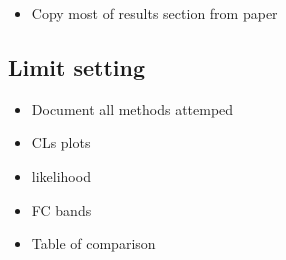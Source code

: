 {\color{Red}
\begin{itemize}
\item Copy most of results section from paper
\end{itemize}
}




\subsection{Limit setting}
\label{sec:B2DsPhi_limitsetting}

{\color{Red}
\begin{itemize}
\item Document all methods attemped
\item CLs plots
\item likelihood
\item FC bands
\item Table of comparison 
\end{itemize}
}
